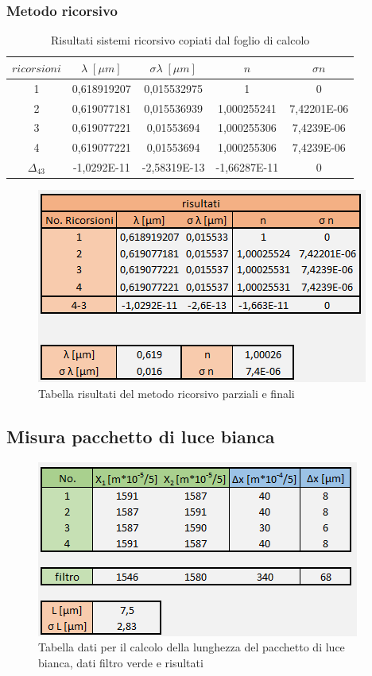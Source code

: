 \documentclass{article}
\begin{document}
\subsubsection{Metodo ricorsivo}

\begin{table}[h!]
\centering
\begin{tabular}{ | c | c | c | c | c | }
\hline
 $ricorsioni$ & $\lambda \; [\mu m]$ & $\sigma\lambda \; [\mu m]$ & $n$ & $\sigma n$\\
\hline
 1 & 0,618919207 & 0,015532975 & 1 & 0\\
 2 & 0,619077181 & 0,015536939 & 1,000255241 & 7,42201E-06\\
 3 & 0,619077221 & 0,01553694 & 1,000255306 & 7,4239E-06\\
 4 & 0,619077221 & 0,01553694 & 1,000255306 & 7,4239E-06\\
\hline
 $\Delta_{4 3}$ & -1,0292E-11 & -2,58319E-13 & -1,66287E-11 & 0\\
\hline
\end{tabular}
\caption{Risultati sistemi ricorsivo copiati dal foglio di calcolo}
\label{table:6}
\end{table}

\begin{figure}[h!]
  \centering
  \includegraphics[width=0.6\linewidth]{IM tabella ricorsione}
  \caption{Tabella risultati del metodo ricorsivo parziali e finali}
\end{figure}


\pagebreak

\subsection{Misura pacchetto di luce bianca}

\begin{figure}[h!]
  \centering
  \includegraphics[width=0.6\linewidth]{IM tabella pacchetto}
  \caption{Tabella dati per il calcolo della lunghezza del pacchetto di luce bianca, dati filtro verde e risultati}
\end{figure}
\end{document}
